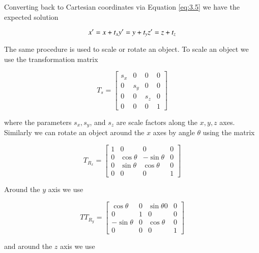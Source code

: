 Converting back to Cartesian coordinates via Equation \ref{eq:3.5} we have the expected solution

\begin{equation}\label{eq:3.8}
x' = x +t_x \\
y' = y + t_y \\
z' = z + t_z
\end{equation}

The same procedure is used to scale or rotate an object. To scale an object we use the transformation matrix

\begin{equation}\label{eq:3.9}
T_s = \left[\begin{array}{cccc}
s_x & 0 & 0 & 0 \\
0 & s_y & 0 & 0 \\
0 & 0 & s_z & 0 \\
0 & 0 & 0 & 1
\end{array}\right]
\end{equation}


where the parameters $s_x, s_y$, and $s_z$ are scale factors along the $x, y, z$ axes. Similarly we can rotate an object around the $x$ axes by angle $\theta$ using the matrix

\begin{equation}\label{eq:3.10}
T_{R_x} = \left[\begin{array}{cccc}
1 & 0 & 0 & 0 \\
0 & \cos\theta & -\sin\theta & 0 \\
0 & \sin\theta & \cos\theta & 0 \\
0 & 0 & 0 & 1
\end{array}\right]
\end{equation}


Around the $y$ axis we use

\begin{equation}\label{eq:3.11}
TT_{R_y} = \left[\begin{array}{cccc}
\cos\theta & 0 & \sin\theta0 & 0 \\
0 & 1 & 0 & 0 \\
-\sin\theta & 0 & \cos\theta & 0 \\
0 & 0 & 0 & 1
\end{array}\right]
\end{equation}

and around the $z$ axis we use

